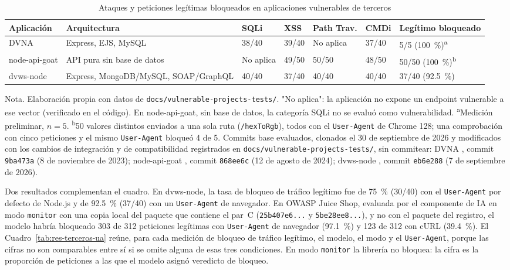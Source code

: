 \begin{table}[H]
\centering
\small
\begin{tabular}{|L{2.0cm}|L{2.4cm}|L{1.3cm}|L{1.3cm}|L{1.4cm}|L{1.3cm}|L{1.8cm}|}
\hline
\textbf{Aplicación} & \textbf{Arquitectura} & \textbf{SQLi} & \textbf{XSS} & \textbf{Path Trav.} & \textbf{CMDi} & \textbf{Legítimo bloqueado} \\ \hline
DVNA \cite{appsecco2026dvna} & Express, EJS, MySQL & 38/40 & 39/40 & No aplica & 37/40 & 5/5 (100~\%)\textsuperscript{a} \\ \hline
node-api-goat \cite{layro012026nodeapigoat} & API pura sin base de datos & No aplica & 49/50 & 50/50 & 48/50 & 50/50 (100~\%)\textsuperscript{b} \\ \hline
dvws-node \cite{snoopysecurity2026dvwsnode} & Express, MongoDB/MySQL, SOAP/GraphQL & 40/40 & 37/40 & 40/40 & 40/40 & 37/40 (92.5~\%) \\ \hline
\end{tabular}
\caption[Bloqueo en aplicaciones de terceros]{Ataques y peticiones legítimas bloqueados en aplicaciones vulnerables de terceros}
\label{tab:res-terceros}
\end{table}
{\footnotesize Nota. Elaboración propia con datos de \texttt{docs/vulnerable-projects-tests/}. "No
aplica": la aplicación no expone un endpoint vulnerable a ese vector (verificado en el código).
En node-api-goat, sin base de datos, la categoría SQLi no se evaluó como vulnerabilidad.
\textsuperscript{a}Medición preliminar, $n=5$. \textsuperscript{b}50 valores distintos enviados a una
sola ruta (\texttt{/hexToRgb}), todos con el \texttt{User-Agent} de Chrome 128; una comprobación con
cinco peticiones y el mismo \texttt{User-Agent} bloqueó 4 de 5. Commits base evaluados, clonados el 30 de septiembre de 2026 y modificados con los cambios de integración y de compatibilidad registrados en \texttt{docs/vulnerable-projects-tests/}, sin commitear: DVNA \cite{appsecco2026dvna}, commit \texttt{9ba473a} (8 de noviembre de
2023); node-api-goat \cite{layro012026nodeapigoat}, commit \texttt{868ee6c} (12 de agosto de 2024);
dvws-node \cite{snoopysecurity2026dvwsnode}, commit \texttt{eb6e288} (7 de septiembre de 2026).}

Dos resultados complementan el cuadro. En dvws-node, la tasa de bloqueo de tráfico legítimo fue
de 75~\% (30/40) con el \texttt{User-Agent} por defecto de Node.js y de 92.5~\% (37/40) con un
\texttt{User-Agent} de navegador. En OWASP Juice Shop, evaluada por el componente de IA en modo
\texttt{monitor} con una copia local del paquete que contiene el par~C (\texttt{25b407e6...} y
\texttt{5be28ee8...}), y no con el paquete del registro, el modelo habría bloqueado 303 de 312
peticiones legítimas con \texttt{User-Agent} de navegador (97.1~\%) y 123 de 312 con cURL
(39.4~\%). El Cuadro~\ref{tab:res-terceros-ua} reúne, para cada medición de bloqueo de tráfico legítimo, el
modelo, el modo y el \texttt{User-Agent}, porque las cifras no son comparables entre sí si se omite
alguna de esas tres condiciones. En modo \texttt{monitor} la librería no bloquea: la cifra es la
proporción de peticiones a las que el modelo asignó veredicto de bloqueo.

